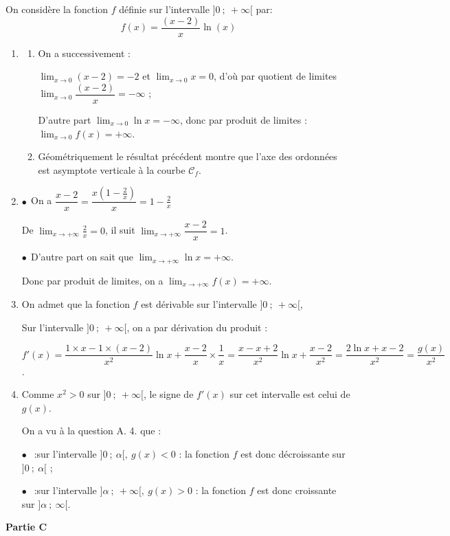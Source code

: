 On considère la fonction $f$ définie sur l'intervalle $]0~;~+\infty[$ par:
\[f(x) = \dfrac{(x-2)}{x}\ln(x)\]
\begin{enumerate}
\item 
	\begin{enumerate}
		\item %
On a successivement :

$\displaystyle\lim_{x \to 0} (x - 2) = - 2$ et $\displaystyle\lim_{x \to 0} x  = 0$, d'où par quotient de limites $\displaystyle\lim_{x \to 0} \dfrac{(x - 2)}{x} = - \infty$ ;

D'autre part $\displaystyle\lim_{x \to 0} \ln x = - \infty$, donc par produit de limites : $\displaystyle\lim_{x \to 0} f(x) = + \infty.$
		\item %
		Géométriquement le résultat précédent montre que l'axe des ordonnées est asymptote verticale à la courbe $\mathcal{C}_f$.
	\end{enumerate}
\item %
$\bullet~~$On a $\dfrac{x - 2}{x} = \dfrac{x\left(1 - \frac2x\right)}{x} = 1 - \frac2x$

De $\displaystyle\lim_{x \to + \infty} \frac2x = 0$, il suit $\displaystyle\lim_{x \to + \infty}\dfrac{x - 2}{x} = 1$.

$\bullet~~$D'autre part on sait que $\displaystyle\lim_{x \to + \infty}\ln x = + \infty$. 

Donc par produit de limites, on a $\displaystyle\lim_{x \to + \infty}f(x) = + \infty$.
\item On admet que la fonction $f$ est dérivable sur l'intervalle $]0~;~+\infty[$,

Sur l'intervalle $]0~;~+\infty[$, on a par dérivation du produit :

$f'(x) = \dfrac{1 \times x - 1 \times (x - 2)}{x^2}\ln x + \dfrac{x - 2}{x} \times \dfrac1x = \dfrac{x - x + 2}{x^2}\ln x + \dfrac{x - 2}{x^2} = \dfrac{2\ln x + x - 2}{x^2} = \dfrac{g(x)}{x^2}$.
\item  %
Comme $x^2 > 0$ sur $]0~;~+\infty[$, le signe de $f'(x)$ sur cet intervalle est celui de $g(x)$.

On a vu à la question A. 4. que :

$\bullet~~$ :sur l'intervalle $]0~;~\alpha[, \: g(x) < 0$ : la fonction $f$ est donc décroissante sur $]0~;~\alpha[$ ;

$\bullet~~$ :sur l'intervalle $]\alpha~;~+ \infty[, \: g(x) > 0$ : la fonction $f$ est donc croissante sur $]\alpha~;~\infty[$.
\end{enumerate}
\medskip
\textbf{Partie C}
\medskip

